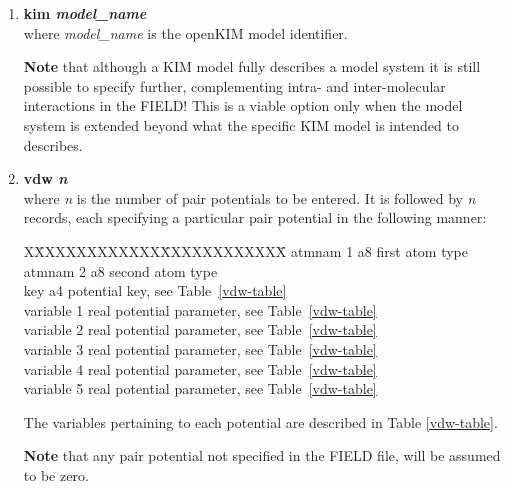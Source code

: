 \begin{enumerate}

\item {\bf kim {\em model\_name}} \\
where {\em model\_name} is the openKIM model identifier.

{\bf Note} that although a KIM model fully describes a model
system it is still possible to specify further, complementing
intra- and inter-molecular interactions in the FIELD!  This
is a viable option only when the model system is extended
beyond what the specific KIM model is intended to describes.

\item {\bf vdw {\em n}} \\
where {\em n} is the number of pair potentials to be entered.  It
is followed by {\em n} records, each specifying a particular pair
potential in the following manner:
\begin{tabbing}
X\=XXXXXXXXXXXX\=XXXXXXXXXXXX\=\kill
\> atmnam 1     \> a8   \> first atom type \\
\> atmnam 2     \> a8   \> second atom type \\
\> key          \> a4   \> potential key, see Table~\ref{vdw-table} \\
\> variable 1   \> real \> potential parameter, see Table~\ref{vdw-table} \\
\> variable 2   \> real \> potential parameter, see Table~\ref{vdw-table} \\
\> variable 3   \> real \> potential parameter, see Table~\ref{vdw-table} \\
\> variable 4   \> real \> potential parameter, see Table~\ref{vdw-table} \\
\> variable 5   \> real \> potential parameter, see Table~\ref{vdw-table}
\end{tabbing}
The variables pertaining to each potential are described in Table
\ref{vdw-table}.

{\bf Note} that any pair potential not specified in the FIELD
file, will be assumed to be zero.


\end{enumerate}
